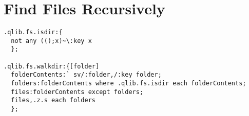 \section{Find Files Recursively}

\begin{verbatim}
.qlib.fs.isdir:{
  not any (();x)~\:key x
  };

.qlib.fs.walkdir:{[folder]
  folderContents:` sv/:folder,/:key folder;
  folders:folderContents where .qlib.fs.isdir each folderContents;
  files:folderContents except folders;
  files,.z.s each folders
  };
\end{verbatim}

\clearpage
